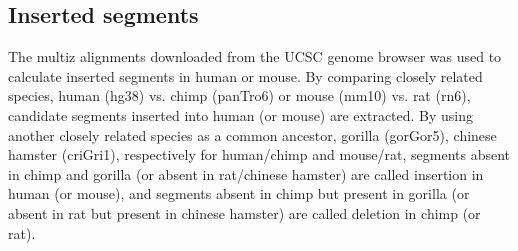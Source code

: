 
\subsection{Inserted segments}
The multiz alignments downloaded from the UCSC genome browser \citep{Kent_2002} was used to calculate inserted segments in human or mouse. By comparing closely related species, human (hg38) vs. chimp (panTro6) or mouse (mm10) vs. rat (rn6), candidate segments inserted into human (or mouse) are extracted. By using another closely related species as a common ancestor, gorilla (gorGor5), chinese hamster (criGri1), respectively for human/chimp and mouse/rat, segments absent in chimp and gorilla (or absent in rat/chinese hamster) are called insertion in human (or mouse), and segments absent in chimp but present in gorilla (or absent in rat but present in chinese hamster) are called deletion in chimp (or rat). 


